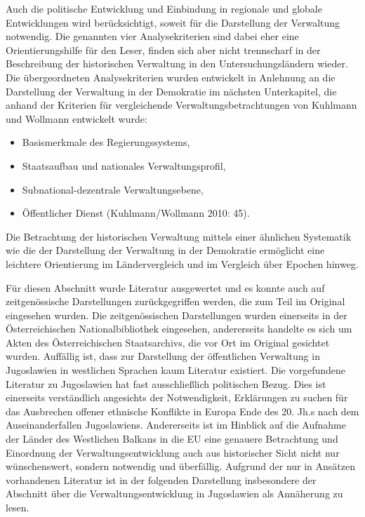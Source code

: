 Auch die politische Entwicklung und Einbindung in regionale und globale Entwicklungen wird berücksichtigt, soweit für die Darstellung der Verwaltung notwendig. Die genannten vier Analysekriterien sind dabei eher eine Orientierungshilfe für den Leser, finden sich aber nicht trennscharf in der Beschreibung der historischen Verwaltung in den Untersuchungsländern wieder. Die übergeordneten Analysekriterien wurden entwickelt in Anlehnung an die Darstellung der Verwaltung in der Demokratie im nächsten Unterkapitel, die anhand der Kriterien für vergleichende Verwaltungsbetrachtungen von Kuhlmann und Wollmann entwickelt wurde: 
\begin{itemize} \itemsep1pt \parskip0pt 
\item Basismerkmale des Regierungssystems,
\item Staatsaufbau und nationales Verwaltungsprofil, 
\item Subnational-dezentrale Verwaltungsebene,
\item Öffentlicher Dienst (Kuhlmann/Wollmann 2010: 45).
\end{itemize}
Die Betrachtung der historischen Verwaltung mittels einer ähnlichen Systematik wie die der Darstellung der Verwaltung in der Demokratie ermöglicht eine leichtere Orientierung im Ländervergleich und im Vergleich über Epochen hinweg. \par
Für diesen Abschnitt wurde Literatur ausgewertet und es konnte auch auf zeitgenössische Darstellungen zurückgegriffen werden, die zum Teil im Original eingesehen wurden. Die zeitgenössischen Darstellungen wurden einerseits in der Österreichischen Nationalbibliothek eingesehen, andererseits handelte es sich um Akten des Österreichischen Staatsarchivs, die vor Ort im Original gesichtet wurden. Auffällig ist, dass zur Darstellung der öffentlichen Verwaltung in Jugoslawien in westlichen Sprachen kaum Literatur existiert. Die vorgefundene Literatur zu Jugoslawien hat fast ausschließlich politischen Bezug. Dies ist einerseits verständlich angesichts der Notwendigkeit, Erklärungen zu suchen für das Ausbrechen offener ethnische Konflikte in Europa Ende des 20. Jh.s nach dem Auseinanderfallen Jugoslawiens. Andererseits ist im Hinblick auf die Aufnahme der Länder des Westlichen Balkans in die EU eine genauere Betrachtung und Einordnung der Verwaltungsentwicklung auch aus historischer Sicht nicht nur wünschenswert, sondern notwendig und überfällig. Aufgrund der nur in Ansätzen vorhandenen Literatur ist in der folgenden Darstellung insbesondere der Abschnitt über die Verwaltungsentwicklung in Jugoslawien als Annäherung zu lesen.
